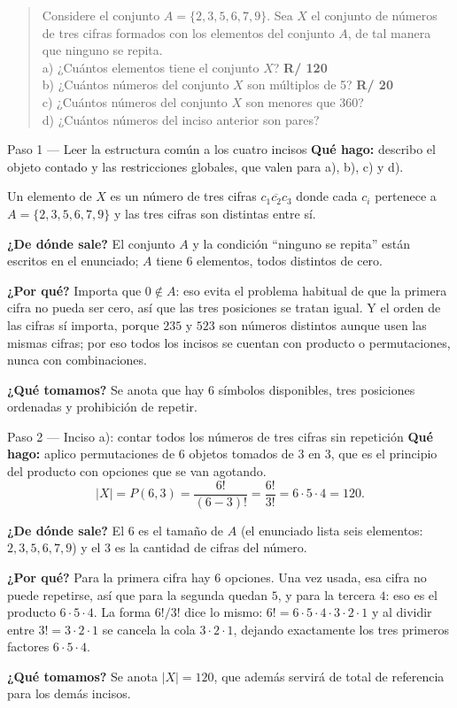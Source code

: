 \documentclass[11pt]{article}
\begin{document}
\begin{quote}
Considere el conjunto $A=\{2,3,5,6,7,9\}$. Sea $X$ el conjunto de números de tres cifras formados con los elementos del conjunto $A$, de tal manera que ninguno se repita.\\[2pt]
a) ¿Cuántos elementos tiene el conjunto $X$? \quad \textbf{R/ 120}\\
b) ¿Cuántos números del conjunto $X$ son múltiplos de 5? \quad \textbf{R/ 20}\\
c) ¿Cuántos números del conjunto $X$ son menores que 360?\\
d) ¿Cuántos números del inciso anterior son pares?
\end{quote}

\begin{paso}{Paso 1 --- Leer la estructura común a los cuatro incisos}
\textbf{Qué hago:} describo el objeto contado y las restricciones globales, que valen para a), b), c) y d).

Un elemento de $X$ es un número de tres cifras $\overline{c_1c_2c_3}$ donde cada $c_i$ pertenece a $A=\{2,3,5,6,7,9\}$ y las tres cifras son distintas entre sí.

\textbf{¿De dónde sale?} El conjunto $A$ y la condición ``ninguno se repita'' están escritos en el enunciado; $A$ tiene $6$ elementos, todos distintos de cero.

\textbf{¿Por qué?} Importa que $0\notin A$: eso evita el problema habitual de que la primera cifra no pueda ser cero, así que las tres posiciones se tratan igual. Y el orden de las cifras sí importa, porque $235$ y $523$ son números distintos aunque usen las mismas cifras; por eso todos los incisos se cuentan con producto o permutaciones, nunca con combinaciones.

\textbf{¿Qué tomamos?} Se anota que hay $6$ símbolos disponibles, tres posiciones ordenadas y prohibición de repetir.
\end{paso}

\begin{paso}{Paso 2 --- Inciso a): contar todos los números de tres cifras sin repetición}
\textbf{Qué hago:} aplico permutaciones de $6$ objetos tomados de $3$ en $3$, que es el principio del producto con opciones que se van agotando.
\[
  |X| = P(6,3) = \frac{6!}{(6-3)!} = \frac{6!}{3!} = 6\cdot 5\cdot 4 = 120 .
\]

\textbf{¿De dónde sale?} El $6$ es el tamaño de $A$ (el enunciado lista seis elementos: $2,3,5,6,7,9$) y el $3$ es la cantidad de cifras del número.

\textbf{¿Por qué?} Para la primera cifra hay $6$ opciones. Una vez usada, esa cifra no puede repetirse, así que para la segunda quedan $5$, y para la tercera $4$: eso es el producto $6\cdot 5\cdot 4$. La forma $6!/3!$ dice lo mismo: $6!=6\cdot 5\cdot 4\cdot 3\cdot 2\cdot 1$ y al dividir entre $3!=3\cdot 2\cdot 1$ se cancela la cola $3\cdot 2\cdot 1$, dejando exactamente los tres primeros factores $6\cdot 5\cdot 4$.

\textbf{¿Qué tomamos?} Se anota $|X|=120$, que además servirá de total de referencia para los demás incisos.
\end{paso}
\end{document}

